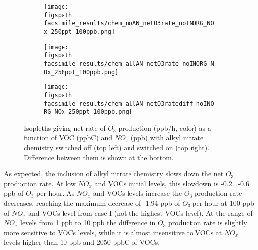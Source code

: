 \documentclass[11pt,a4paper]{article}
\newcommand{\figspath}{figures/}
\begin{document}
\begin{figure}[h!] %
	\centering
	\begin{subfigure}[t]{0.45\textwidth}
        \centering
        \texttt{[image: \\figspath facsimile\_results/chem\_noAN\_netO3rate\_noINORG\_NOx\_250ppt\_100ppb.png]}
        \caption{}
    \end{subfigure}%
    \hfill
    \begin{subfigure}[t]{0.45\textwidth}
        \centering
        \texttt{[image: \\figspath facsimile\_results/chem\_allAN\_netO3rate\_noINORG\_NOx\_250ppt\_100ppb.png]}
        \caption{}
    \end{subfigure}
    \hfill
    \begin{subfigure}[t]{0.45\textwidth}
        \centering
        \texttt{[image: \\figspath facsimile\_results/chem\_allAN\_netO3ratediff\_noINORG\_NOx\_250ppt\_100ppb.png]}
        \caption{}
    \end{subfigure}%
    \hfill
\caption{Isopleths giving net rate of $O_3$ production (ppb/h, color) as a function of VOC (ppbC) and $NO_x$ (ppb) with alkyl nitrate chemistry switched off (top left) and switched on (top right). Difference between them is shown at the bottom.}
\label{fig:netO3rate_noAN_withAN_diff}
\end{figure}

As expected, the inclusion of alkyl nitrate chemistry slows down the net $O_3$ production rate. At low $NO_x$ and VOCs initial levels, this slowdown is -0.2...-0.6 ppb of $O_3$ per hour. As $NO_x$ and VOCs levels increase the $O_3$ production rate decreases, reaching the maximum decrease of -1.94 ppb of $O_3$ per hour at 100 ppb of $NO_x$ and VOCs level from case I (not the highest VOCs level). At the range of $NO_x$ levels from 1 ppb to 10 ppb the difference in $O_3$ production rate is slightly more sensitive to VOCs levels, while it is almost insensitive to VOCs at $NO_x$ levels higher than 10 ppb and 2050 ppbC of VOCs. 
\end{document}
